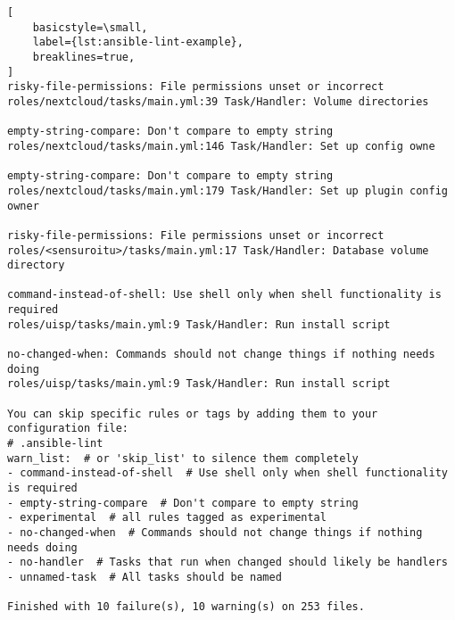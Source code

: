 \begin{lstlisting}[
    basicstyle=\small,
    label={lst:ansible-lint-example},
    breaklines=true,
]
risky-file-permissions: File permissions unset or incorrect
roles/nextcloud/tasks/main.yml:39 Task/Handler: Volume directories

empty-string-compare: Don't compare to empty string
roles/nextcloud/tasks/main.yml:146 Task/Handler: Set up config owne

empty-string-compare: Don't compare to empty string
roles/nextcloud/tasks/main.yml:179 Task/Handler: Set up plugin config owner

risky-file-permissions: File permissions unset or incorrect
roles/<sensuroitu>/tasks/main.yml:17 Task/Handler: Database volume directory

command-instead-of-shell: Use shell only when shell functionality is required
roles/uisp/tasks/main.yml:9 Task/Handler: Run install script

no-changed-when: Commands should not change things if nothing needs doing
roles/uisp/tasks/main.yml:9 Task/Handler: Run install script

You can skip specific rules or tags by adding them to your configuration file:
# .ansible-lint
warn_list:  # or 'skip_list' to silence them completely
- command-instead-of-shell  # Use shell only when shell functionality is required
- empty-string-compare  # Don't compare to empty string
- experimental  # all rules tagged as experimental
- no-changed-when  # Commands should not change things if nothing needs doing
- no-handler  # Tasks that run when changed should likely be handlers
- unnamed-task  # All tasks should be named

Finished with 10 failure(s), 10 warning(s) on 253 files.
\end{lstlisting}

